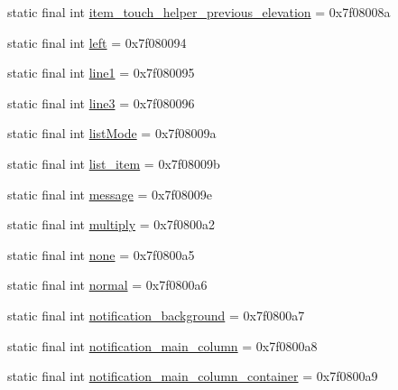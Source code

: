 \begin{DoxyCompactItemize}
\item 
static final int \mbox{\hyperlink{classcom_1_1synnapps_1_1carouselview_1_1_r_1_1id_ab11f770acbd861b5c23bb970138146da}{item\+\_\+touch\+\_\+helper\+\_\+previous\+\_\+elevation}} = 0x7f08008a
\item 
static final int \mbox{\hyperlink{classcom_1_1synnapps_1_1carouselview_1_1_r_1_1id_aefa848824140814b1941152c18331411}{left}} = 0x7f080094
\item 
static final int \mbox{\hyperlink{classcom_1_1synnapps_1_1carouselview_1_1_r_1_1id_a6d7f3662df7c9bb720c8259fe6f333f9}{line1}} = 0x7f080095
\item 
static final int \mbox{\hyperlink{classcom_1_1synnapps_1_1carouselview_1_1_r_1_1id_a746f0ea6e3f061a81f10b4227df1fbb1}{line3}} = 0x7f080096
\item 
static final int \mbox{\hyperlink{classcom_1_1synnapps_1_1carouselview_1_1_r_1_1id_accb5644c5d296207b1c87b7975e3138c}{list\+Mode}} = 0x7f08009a
\item 
static final int \mbox{\hyperlink{classcom_1_1synnapps_1_1carouselview_1_1_r_1_1id_a4da6fc43c559b755fc25352903a4875b}{list\+\_\+item}} = 0x7f08009b
\item 
static final int \mbox{\hyperlink{classcom_1_1synnapps_1_1carouselview_1_1_r_1_1id_afa4392f665ab759a2c22d8dc9d58fc17}{message}} = 0x7f08009e
\item 
static final int \mbox{\hyperlink{classcom_1_1synnapps_1_1carouselview_1_1_r_1_1id_a9182231a7289ffb1a19836c50d3c6b5f}{multiply}} = 0x7f0800a2
\item 
static final int \mbox{\hyperlink{classcom_1_1synnapps_1_1carouselview_1_1_r_1_1id_a33dc6650f49148fe6bba3949726cf0c0}{none}} = 0x7f0800a5
\item 
static final int \mbox{\hyperlink{classcom_1_1synnapps_1_1carouselview_1_1_r_1_1id_a1235f4acedaac799f64cc9314b66c8e1}{normal}} = 0x7f0800a6
\item 
static final int \mbox{\hyperlink{classcom_1_1synnapps_1_1carouselview_1_1_r_1_1id_a222add612abfe376445a0328d892cc96}{notification\+\_\+background}} = 0x7f0800a7
\item 
static final int \mbox{\hyperlink{classcom_1_1synnapps_1_1carouselview_1_1_r_1_1id_a21f063e50e4e132e3609e579d132d5d6}{notification\+\_\+main\+\_\+column}} = 0x7f0800a8
\item 
static final int \mbox{\hyperlink{classcom_1_1synnapps_1_1carouselview_1_1_r_1_1id_a3ead516394f6af539b9f5110b15b6f27}{notification\+\_\+main\+\_\+column\+\_\+container}} = 0x7f0800a9
\item 

\end{DoxyCompactItemize}
